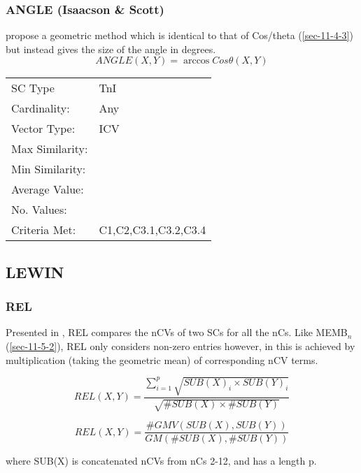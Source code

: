 \documentclass{article}
\begin{document}
\subsubsection{ANGLE (Isaacson \& Scott)}
\label{sec-11-6-4}

\citet{Scott1998} propose a geometric method which is identical to
that of Cos/theta (\ref{sec-11-4-3}) but instead gives the size of the
angle in degrees. $$ANGLE(X,Y) = \arccos{Cos\theta(X,Y)}$$

\begin{center}
\begin{tabular}{ll}
 SC Type          &  TnI                   \\
 Cardinality:     &  Any                   \\
 Vector Type:     &  ICV                   \\
 Max Similarity:  &                        \\
 Min Similarity:  &                        \\
 Average Value:   &                        \\
 No. Values:      &                        \\
 Criteria Met:    &  C1,C2,C3.1,C3.2,C3.4  \\
\end{tabular}
\end{center}
\subsection{LEWIN}
\label{sec-11-7}
\subsubsection{REL}
\label{sec-11-7-1}

Presented in \citet{Lewin1979}, REL compares the nCVs of two SCs for
all the nCs. Like MEMB$_{n}$ (\ref{sec-11-5-2}), REL only considers non-zero
entries however, in this is achieved by multiplication (taking the
geometric mean) of corresponding nCV terms.

$$REL(X,Y)=\frac{\sum_{i=1}^{p}{\sqrt{SUB(X)_{i}\times SUB(Y)_{i}}}}{\sqrt{\#SUB(X)\times \#SUB(Y)}}$$

$$REL(X,Y)=\frac{\#GMV(SUB(X),SUB(Y))}{GM(\#SUB(X),\#SUB(Y))}$$

where SUB(X) is concatenated nCVs from nCs 2-12, and has a length p.
\end{document}
